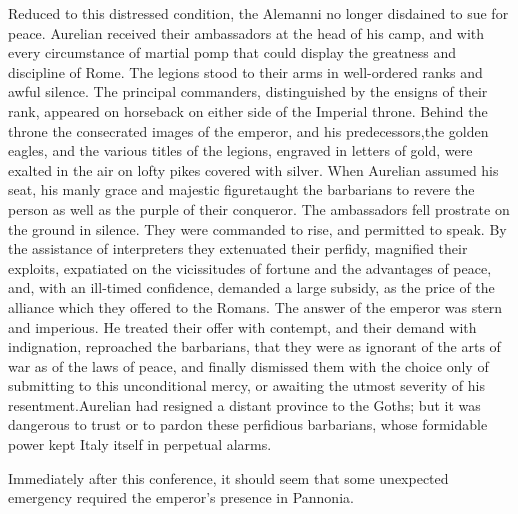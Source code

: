 Reduced to this distressed condition, the Alemanni no longer
disdained to sue for peace. Aurelian received their ambassadors
at the head of his camp, and with every circumstance of martial
pomp that could display the greatness and discipline of Rome. The
legions stood to their arms in well-ordered ranks and awful
silence. The principal commanders, distinguished by the ensigns
of their rank, appeared on horseback on either side of the
Imperial throne. Behind the throne the consecrated images of the
emperor, and his predecessors,\footnotemark[29] the golden eagles, and the
various titles of the legions, engraved in letters of gold, were
exalted in the air on lofty pikes covered with silver. When
Aurelian assumed his seat, his manly grace and majestic figure\footnotemark[30]
taught the barbarians to revere the person as well as the purple
of their conqueror. The ambassadors fell prostrate on the ground
in silence. They were commanded to rise, and permitted to speak.
By the assistance of interpreters they extenuated their perfidy,
magnified their exploits, expatiated on the vicissitudes of
fortune and the advantages of peace, and, with an ill-timed
confidence, demanded a large subsidy, as the price of the
alliance which they offered to the Romans. The answer of the
emperor was stern and imperious. He treated their offer with
contempt, and their demand with indignation, reproached the
barbarians, that they were as ignorant of the arts of war as of
the laws of peace, and finally dismissed them with the choice
only of submitting to this unconditional mercy, or awaiting the
utmost severity of his resentment.\footnotemark[31] Aurelian had resigned a
distant province to the Goths; but it was dangerous to trust or
to pardon these perfidious barbarians, whose formidable power
kept Italy itself in perpetual alarms.




Immediately after this conference, it should seem that some
unexpected emergency required the emperor’s presence in Pannonia.

